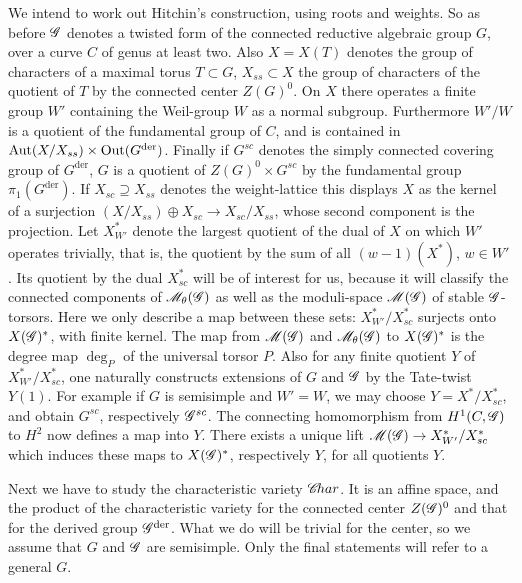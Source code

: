 \documentclass[12pt,english]{smfart}
\theoremstyle{plain} \newtheorem{innerthm}{Theorem} \newtheorem{innerlem}{Lemma} \newtheorem{innerprop}{Proposition} \newtheorem{innercor}{Corollary} \theoremstyle{definition} \newtheorem{innerdefn}{Definition} \newtheorem{innerconstr}{Construction} \theoremstyle{remark} \newtheorem*{remark}{Remark} \newtheorem*{remarks}{Remarks} \newtheorem*{applications}{Applications}
\begin{document}
We intend to work out Hitchin's construction, using roots and weights. So as before $\mathscr{G}$ denotes a twisted form of the connected reductive algebraic group $G$, over a curve $C$ of genus at least two. Also $X=X(T)$ denotes the group of characters of a maximal torus $T\subset G$, $X_{ss}\subset X$ the group of characters of the quotient of $T$ by the connected center $Z(G)^0$. On $X$ there operates a finite group $W'$ containing the Weil-group $W$ as a normal subgroup. Furthermore $W'/W$ is a quotient of the fundamental group of $C$, and is contained in $\operatorname{Aut}(X/X_{ss})\times\operatorname{Out}(G^{\mathrm{der}})$. Finally if $G^{sc}$ denotes the simply connected covering group of $G^{\mathrm{der}}$, $G$ is a quotient of $Z(G)^0\times G^{sc}$ by the fundamental group $\pi_1(G^{\mathrm{der}})$. If $X_{sc}\supseteq X_{ss}$ denotes the weight-lattice this displays $X$ as the kernel of a surjection $(X/X_{ss})\oplus X_{sc}\to X_{sc}/X_{ss}$, whose second component is the projection. Let $X^*_{W'}$ denote the largest quotient of the dual of $X$ on which $W'$ operates trivially, that is, the quotient by the sum of all $(w-1)(X^*)$, $w\in W'$. Its quotient by the dual $X^*_{sc}$ will be of interest for us, because it will classify the connected components of $\mathscr{M}_\theta(\mathscr{G})$ as well as the moduli-space $\mathscr{M}(\mathscr{G})$ of stable $\mathscr{G}$-torsors. Here we only describe a map between these sets: $X^*_{W'}/X^*_{sc}$ surjects onto $X(\mathscr{G})^*$, with finite kernel. The map from $\mathscr{M}(\mathscr{G})$ and $\mathscr{M}_\theta(\mathscr{G})$ to $X(\mathscr{G})^*$ is the degree map $\deg_P$ of the universal torsor $P$. Also for any finite quotient $Y$ of $X^*_{W'}/X^*_{sc}$, one naturally constructs extensions of $G$ and $\mathscr{G}$ by the Tate-twist $Y(1)$. For example if $G$ is semisimple and $W'=W$, we may choose $Y=X^*/X^*_{sc}$, and obtain $G^{sc}$, respectively $\mathscr{G}^{sc}$. The connecting homomorphism from $H^1(C,\mathscr{G})$ to $H^2$ now defines a map into $Y$. There exists a unique lift $\mathscr{M}(\mathscr{G})\to X^*_{W'}/X^*_{sc}$ which induces these maps to $X(\mathscr{G})^*$, respectively $Y$, for all quotients $Y$.

Next we have to study the characteristic variety $\mathscr{C}\!har$. It is an affine space, and the product of the characteristic variety for the connected center $Z(\mathscr{G})^0$ and that for the derived group $\mathscr{G}^{\mathrm{der}}$. What we do will be trivial for the center, so we assume that $G$ and $\mathscr{G}$ are semisimple. Only the final statements will refer to a general $G$.
\end{document}
